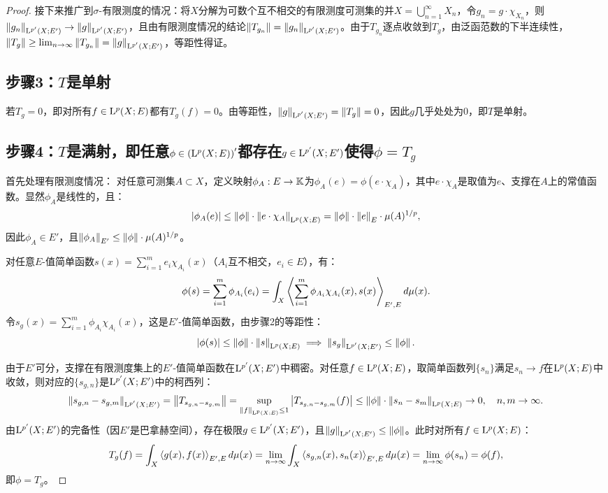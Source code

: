 \begin{proof}
接下来推广到$\sigma$-有限测度的情况：将$X$分解为可数个互不相交的有限测度可测集的并$X = \bigcup_{n=1}^\infty X_n$，令$g_n = g \cdot \chi_{X_n}$，则$\left\| g_n \right\|_{\mathrm{L}^{p'}(X;E')} \to \left\| g \right\|_{\mathrm{L}^{p'}(X;E')}$，且由有限测度情况的结论$\left\| T_{g_n} \right\| = \left\| g_n \right\|_{\mathrm{L}^{p'}(X;E')}$。由于$T_{g_n}$逐点收敛到$T_g$，由泛函范数的下半连续性，$\left\| T_g \right\| \geq \lim_{n\to\infty} \left\| T_{g_n} \right\| = \left\| g \right\|_{\mathrm{L}^{p'}(X;E')}$，等距性得证。

\subsection{步骤3：$T$是单射}
若$T_g = 0$，即对所有$f\in \mathrm{L}^{p}(X;E)$都有$T_g(f)=0$。由等距性，$\left\| g \right\|_{\mathrm{L}^{p'}(X;E')} = \left\| T_g \right\| = 0$，因此$g$几乎处处为0，即$T$是单射。

\subsection{步骤4：$T$是满射，即任意$\phi\in\left(\mathrm{L}^{p}(X;E)\right)'$都存在$g\in\mathrm{L}^{p'}(X;E')$使得$\phi=T_g$}
首先处理有限测度情况：
对任意可测集$A\subset X$，定义映射$\phi_A: E\to\mathbb{K}$为$\phi_A(e) = \phi(e \cdot \chi_A)$，其中$e\cdot\chi_A$是取值为$e$、支撑在$A$上的常值函数。显然$\phi_A$是线性的，且：
$$
\left| \phi_A(e) \right| \leq \left\| \phi \right\| \cdot \left\| e \cdot \chi_A \right\|_{\mathrm{L}^{p}(X;E)} = \left\| \phi \right\| \cdot \left\| e \right\|_E \cdot \mu(A)^{1/p},
$$
因此$\phi_A \in E'$，且$\left\| \phi_A \right\|_{E'} \leq \left\| \phi \right\| \cdot \mu(A)^{1/p}$。

对任意$E$-值简单函数$s(x) = \sum_{i=1}^m e_i \chi_{A_i}(x)$（$A_i$互不相交，$e_i\in E$），有：
$$
\phi(s) = \sum_{i=1}^m \phi_{A_i}(e_i) = \int_X \left\langle  \sum_{i=1}^m \phi_{A_i} \chi_{A_i}(x) ,  s(x)  \right\rangle_{E',E} d\mu(x).
$$
令$s_g(x) = \sum_{i=1}^m \phi_{A_i} \chi_{A_i}(x)$，这是$E'$-值简单函数，由步骤2的等距性：
$$
\left| \phi(s) \right| \leq \left\| \phi \right\| \cdot \left\| s \right\|_{\mathrm{L}^{p}(X;E)} \implies \left\| s_g \right\|_{\mathrm{L}^{p'}(X;E')} \leq \left\| \phi \right\|.
$$

由于$E'$可分，支撑在有限测度集上的$E'$-值简单函数在$\mathrm{L}^{p'}(X;E')$中稠密。对任意$f\in\mathrm{L}^{p}(X;E)$，取简单函数列$\{s_n\}$满足$s_n \to f$在$\mathrm{L}^{p}(X;E)$中收敛，则对应的$\{s_{g,n}\}$是$\mathrm{L}^{p'}(X;E')$中的柯西列：
$$
\left\| s_{g,n} - s_{g,m} \right\|_{\mathrm{L}^{p'}(X;E')} = \left\| T_{s_{g,n} - s_{g,m}} \right\| = \sup_{\left\| f \right\|_{\mathrm{L}^{p}(X;E)}\leq1} \left| T_{s_{g,n}-s_{g,m}}(f) \right| \leq \left\| \phi \right\| \cdot \left\| s_n - s_m \right\|_{\mathrm{L}^{p}(X;E)} \to 0, \quad n,m\to\infty.
$$
由$\mathrm{L}^{p'}(X;E')$的完备性（因$E'$是巴拿赫空间），存在极限$g\in\mathrm{L}^{p'}(X;E')$，且$\left\| g \right\|_{\mathrm{L}^{p'}(X;E')} \leq \left\| \phi \right\|$。此时对所有$f\in\mathrm{L}^{p}(X;E)$：
$$
T_g(f) = \int_X \left\langle g(x), f(x) \right\rangle_{E',E} d\mu(x) = \lim_{n\to\infty} \int_X \left\langle s_{g,n}(x), s_n(x) \right\rangle_{E',E} d\mu(x) = \lim_{n\to\infty} \phi(s_n) = \phi(f),
$$
即$\phi = T_g$。


\end{proof}
